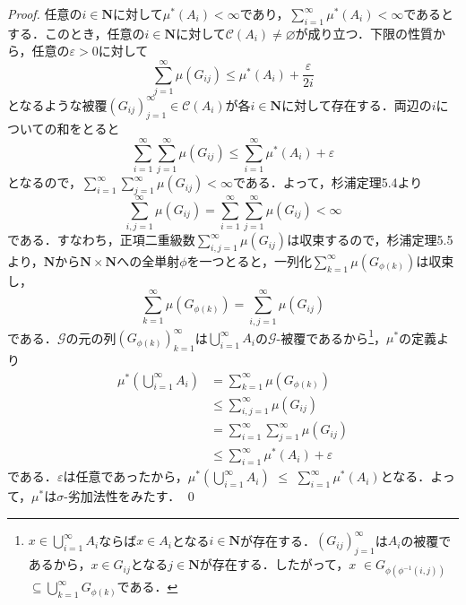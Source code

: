 \documentclass[12pt,a4paper]{jsarticle}
\begin{document}
\begin{proof}
    任意の$i \in \bm{N}$に対して$\mu^*(A_i) < \infty$であり，$\sum_{i = 1}^\infty \mu^*(A_i) < \infty$であるとする．このとき，任意の$i \in \bm{N}$に対して$\mathcal{C}(A_i) \not= \varnothing$が成り立つ．下限の性質から，任意の$\varepsilon > 0$に対して
    \begin{equation*}
        \sum_{j = 1}^\infty \mu(G_{ij}) \leq \mu^*(A_i) + \frac{\varepsilon}{2i}
    \end{equation*}
    となるような被覆$(G_{ij})_{j = 1}^\infty \in \mathcal{C}(A_i)$が各$i \in \bm{N}$に対して存在する．両辺の$i$についての和をとると
    \begin{equation*}
        \sum_{i = 1}^\infty \sum_{j = 1}^\infty \mu(G_{ij}) \leq \sum_{i = 1}^\infty \mu^*(A_i) + \varepsilon
    \end{equation*}
    となるので，$\sum_{i = 1}^\infty \sum_{j = 1}^\infty \mu(G_{ij}) < \infty$である．よって，杉浦\cite{杉浦}定理5.4より
    \begin{equation*}
        \sum_{i, j = 1}^\infty \mu(G_{ij}) = \sum_{i = 1}^\infty \sum_{j = 1}^\infty \mu(G_{ij}) < \infty
    \end{equation*}
    である．すなわち，正項二重級数$\sum_{i, j = 1}^\infty \mu(G_{ij})$は収束するので，杉浦\cite{杉浦}定理5.5より，$\bm{N}$から$\bm{N} \times \bm{N}$への全単射$\phi$を一つとると，一列化$\sum_{k = 1}^\infty \mu(G_{\phi(k)})$は収束し，
    \begin{equation*}
        \sum_{k = 1}^\infty \mu(G_{\phi(k)}) = \sum_{i, j = 1}^\infty \mu(G_{ij})
    \end{equation*}
    である．$\mathcal{G}$の元の列$(G_{\phi(k)})_{k = 1}^\infty$は$\bigcup_{i = 1}^\infty A_i$の$\mathcal{G}$-被覆であるから\footnote{$x \in \bigcup_{i = 1}^\infty A_i$ならば$x \in A_i$となる$i \in \bm{N}$が存在する．$(G_{ij})_{j = 1}^\infty$は$A_i$の被覆であるから，$x \in G_{ij}$となる$j \in \bm{N}$が存在する．したがって，$x$ $\in G_{\phi(\phi^{-1}(i, j))}$ $\subseteq \bigcup_{k = 1}^\infty G_{\phi(k)}$である．}，$\mu^*$の定義より
    \begin{align*}
        \mu^*\left(\bigcup_{i = 1}^\infty A_i\right)
        &= \sum_{k = 1}^\infty \mu(G_{\phi(k)}) \\
        &\leq \sum_{i, j = 1}^\infty \mu(G_{ij}) \\
        &= \sum_{i = 1}^\infty \sum_{j = 1}^\infty \mu(G_{ij}) \\
        &\leq \sum_{i = 1}^\infty \mu^*(A_i) + \varepsilon
    \end{align*}
    である．$\varepsilon$は任意であったから，$\mu^*(\bigcup_{i = 1}^\infty A_i)$ $\leq$ $\sum_{i = 1}^\infty \mu^*(A_i)$となる．よって，$\mu^*$は$\sigma$-劣加法性をみたす．
    \qed
\end{proof}
\end{document}
